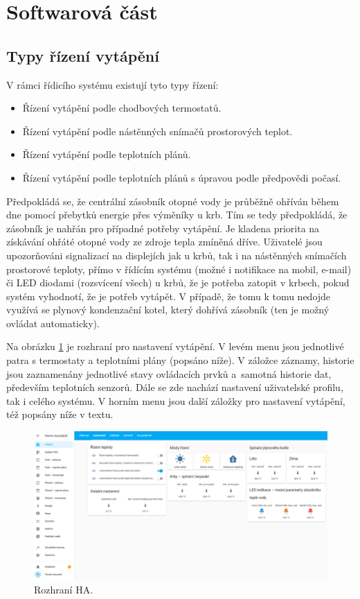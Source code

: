 \section{Softwarová část}

\subsection{Typy řízení vytápění}
\label{sec:typy-rizeni-vytapeni}
V rámci řídicího systému existují tyto typy řízení:

\begin{itemize}
  \item Řízení vytápění podle chodbových termostatů.
  \item Řízení vytápění podle nástěnných snímačů prostorových teplot.
  \item Řízení vytápění podle teplotních plánů.
  \item Řízení vytápění podle teplotních plánů s úpravou podle předpovědi počasí.
\end{itemize}

Předpokládá se, že centrální zásobník otopné vody je průběžně ohříván během dne pomocí přebytků energie přes výměníky u krb. Tím se tedy předpokládá, že zásobník je nahřán pro případné potřeby vytápění. Je kladena priorita na získávání ohřáté otopné vody ze zdroje tepla zmíněná dříve. Uživatelé jsou upozorňováni signalizací na displejích jak u krbů, tak i na nástěnných snímačích prostorové teploty, přímo v řídícím systému (možné i notifikace na mobil, e-mail) či LED diodami (rozsvícení všech) u krbů, že je potřeba zatopit v krbech, pokud systém vyhodnotí, že je potřeb vytápět. V případě, že tomu k tomu nedojde využívá se plynový kondenzační kotel, který dohřívá zásobník (ten je možný ovládat automaticky).

Na obrázku \ref{} je rozhraní pro nastavení vytápění. V levém menu jsou jednotlivé patra s termostaty a teplotními plány (popsáno níže). V záložce záznamy, historie jsou zaznamenány jednotlivé stavy ovládacích prvků a~samotná historie dat, především teplotních senzorů. Dále se zde nachází nastavení uživatelské profilu, tak i celého systému. V horním menu jsou další záložky pro nastavení vytápění, též popsány níže v textu.

\begin{figure}[H]
    \centering
    \includegraphics[width=\textwidth]{images/software-ha/prehled-ha.png}
    \caption{Rozhraní HA.}
    \label{fig:prehled-ha}
\end{figure}


